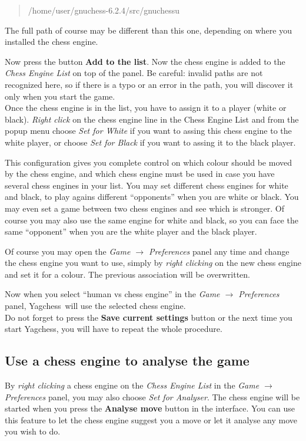 \documentclass[a4paper]{article}
\newcommand{\nameprog}{Yagchess}
\begin{document}
\begin{quote}
/home/user/gnuchess-6.2.4/src/gnuchessu
\end{quote}

The full path of course may be different than this one, depending on where you installed the chess engine.

Now press the button \textbf{Add to the list}. Now the chess engine is added to the \textit{Chess Engine List} on top of the panel.
Be careful: invalid paths are not recognized here, so if there is a typo or an error in the path, you will discover it only when you start the game.\\

Once the chess engine is in the list, you have to assign it to a player (white or black). \textit{Right click} on the chess engine line in the Chess Engine List
and from the popup menu choose \textit{Set for White} if you want to assing this chess engine to the white player, or choose \textit{Set for Black}
if you want to assing it to the black player.

This configuration gives you complete control on which colour should be moved by the chess engine, and which chess engine must be used in case you have several chess engines
in your list. You may set different chess engines for white and black, to play agains different ``opponents'' when you are white or black. You may even set a game
between two chess engines and see which is stronger. Of course you may also use the same engine for white and black, so you can face the same ``opponent'' when
you are the white player and the black player.

Of course you may open the \textit{Game $\rightarrow$ Preferences} panel any time and change the chess engine you want to use, simply by \textit{right clicking}
on the new chess engine and set it for a colour. The previous association will be overwritten.

Now when you select ``human vs chess engine'' in the \textit{Game $\rightarrow$ Preferences} panel, \nameprog\ will use the selected chess engine.\\

Do not forget to press the \textbf{Save current settings} button or the next time you start \nameprog, you will have to repeat the whole procedure.


\subsection{Use a chess engine to analyse the game}
\label{howce:analys}
By \textit{right clicking} a chess engine on the \textit{Chess Engine List} in the \textit{Game $\rightarrow$ Preferences} panel, you may also choose
\textit{Set for Analyser}. The chess engine will be started when you press the \textbf{Analyse move} button in the interface. You can use this feature to let the chess engine
suggest you a move or let it analyse any move you wish to do.
\end{document}
